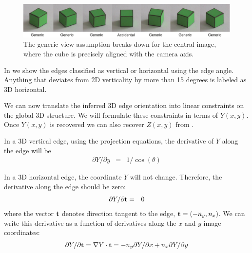  
\begin{figure}[t]
\centerline{
\includegraphics[width=1\linewidth]{figures/simplesystem/accidentalAlignments.pdf}
} 
\caption{The generic-view assumption breaks down for the central image, where the cube is precisely aligned with the camera axis.  
} 
\label{fig:accidentalAlignments}
\end{figure}


In \fig{\ref{fig:gradient}} we show the edges classified as vertical or horizontal using the edge angle. Anything that deviates from 2D verticality by more than 15 degrees is labeled as 3D horizontal.


We can now translate the inferred 3D edge orientation into linear constraints  on the global 3D structure. We will formulate these constraints in terms of $Y(x,y)$. Once $Y(x,y)$ is recovered we can also recover $Z(x,y)$ from \eqn{\ref{eq:projection}}. 

In a 3D vertical edge, using the projection equations, the derivative of $Y$ along the edge will be
\begin{eqnarray}
\partial Y / \partial y & = & 1/ \cos(\theta)
\label{eqn:derivative_Y_along_edge}
\end{eqnarray}


In a 3D horizontal edge, the coordinate $Y$ will not change. Therefore, the derivative along the edge should be zero:
\begin{eqnarray}
\partial Y / \partial {\bf t} & = & 0 
\label{eqn:derivative_Y_along_edge_hor}
\end{eqnarray}
where the vector $\bf t$ denotes direction tangent to the edge, ${\bf t}=(-n_y, n_x)$. 
We can write this derivative as a function of derivatives along the $x$ and $y$ image coordinates:
\begin{eqnarray}
\partial Y / \partial {\bf t} =  \nabla Y \cdot {\bf t} = -n_y \partial Y / \partial x + n_x \partial Y / \partial y
\label{eqn:derivative_Y_along_edge_tan}
\end{eqnarray}

